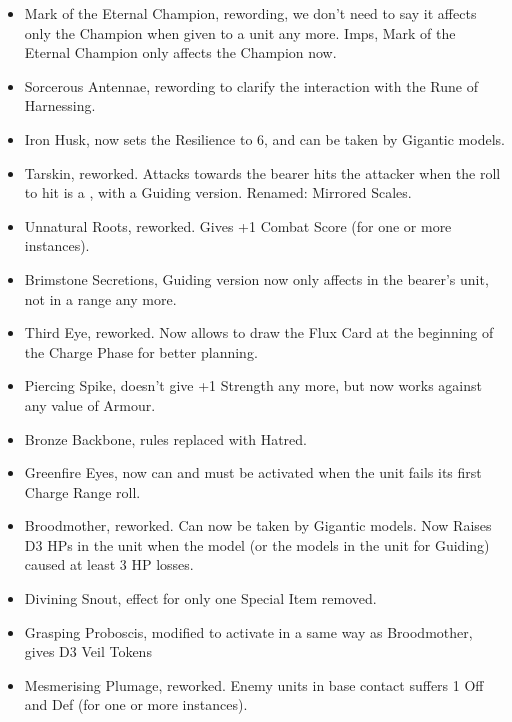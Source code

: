 

\subtitle{2.2}

\subtitle{Clarification and Corrections}

\begin{itemize}
\item Mark of the Eternal Champion, rewording, we don't need to say it affects only the Champion when given to a unit any more. Imps, Mark of the Eternal Champion only affects the Champion now.
\item Sorcerous Antennae, rewording to clarify the interaction with the Rune of Harnessing.
\end{itemize}

\subtitle{Rules changes}

\begin{itemize}
\item Iron Husk, now sets the Resilience to 6, and can be taken by Gigantic models.
\item Tarskin, reworked. Attacks towards the bearer hits the attacker when the roll to hit is a , with a Guiding version. Renamed: Mirrored Scales.
\item Unnatural Roots, reworked. Gives +1 Combat Score (for one or more instances).
\item Brimstone Secretions, Guiding version now only affects \rnf{} in the bearer's unit, not in a  range any more.
\item Third Eye, reworked. Now allows to draw the Flux Card at the beginning of the Charge Phase for better planning.
\item Piercing Spike, doesn't give +1 Strength any more, but now works against any value of Armour.
\item Bronze Backbone, rules replaced with Hatred.
\item Greenfire Eyes, now can and must be activated when the unit fails its first Charge Range roll.
\item Broodmother, reworked. Can now be taken by Gigantic models. Now Raises D3 HPs in the unit when the model (or the \rnf{} models in the unit for Guiding) caused at least 3 HP losses.
\item Divining Snout, effect for only one Special Item removed.
\item Grasping Proboscis, modified to activate in a same way as Broodmother, gives D3 Veil Tokens
\item Mesmerising Plumage, reworked. Enemy units in base contact suffers \minuss{}1 Off and Def (for one or more instances).

\end{itemize}
